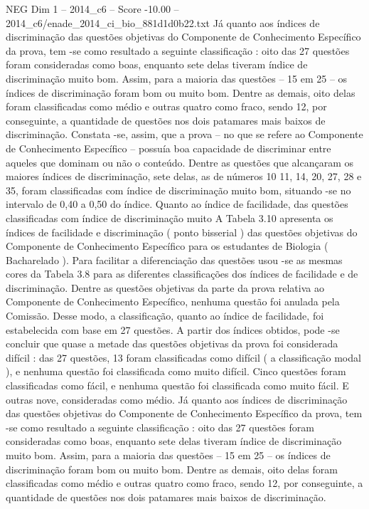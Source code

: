 \begin{textsample}{NEG Dim 1 – 2014\_c6 – Score -10.00 – 2014\_c6/enade\_2014\_ci\_bio\_881d1d0b22.txt}
Já quanto aos índices de discriminação das questões objetivas do Componente de Conhecimento Específico da prova, tem -se como resultado a seguinte classificação : oito das 27 questões foram consideradas como boas, enquanto sete delas tiveram índice de discriminação muito bom.
Assim, para a maioria das questões – 15 em 25 – os índices de discriminação foram bom ou muito bom.
Dentre as demais, oito delas foram classificadas como médio e outras quatro como fraco, sendo 12, por conseguinte, a quantidade de questões nos dois patamares mais baixos de discriminação.
Constata -se, assim, que a prova – no que se refere ao Componente de Conhecimento Específico – possuía boa capacidade de discriminar entre aqueles que dominam ou não o conteúdo.
Dentre as questões que alcançaram os maiores índices de discriminação, sete delas, as de números 10 11, 14, 20, 27, 28 e 35, foram classificadas com índice de discriminação muito bom, situando -se no intervalo de 0,40 a 0,50 do índice.
Quanto ao índice de facilidade, das questões classificadas com índice de discriminação muito A Tabela 3.10 apresenta os índices de facilidade e discriminação ( ponto bisserial ) das questões objetivas do Componente de Conhecimento Específico para os estudantes de Biologia ( Bacharelado ).
Para facilitar a diferenciação das questões usou -se as mesmas cores da Tabela 3.8 para as diferentes classificações dos índices de facilidade e de discriminação.
Dentre as questões objetivas da parte da prova relativa ao Componente de Conhecimento Específico, nenhuma questão foi anulada pela Comissão.
Desse modo, a classificação, quanto ao índice de facilidade, foi estabelecida com base em 27 questões.
A partir dos índices obtidos, pode -se concluir que quase a metade das questões objetivas da prova foi considerada difícil : das 27 questões, 13 foram classificadas como difícil ( a classificação modal ), e nenhuma questão foi classificada como muito difícil.
Cinco questões foram classificadas como fácil, e nenhuma questão foi classificada como muito fácil.
E outras nove, consideradas como médio.
Já quanto aos índices de discriminação das questões objetivas do Componente de Conhecimento Específico da prova, tem -se como resultado a seguinte classificação : oito das 27 questões foram consideradas como boas, enquanto sete delas tiveram índice de discriminação muito bom.
Assim, para a maioria das questões – 15 em 25 – os índices de discriminação foram bom ou muito bom.
Dentre as demais, oito delas foram classificadas como médio e outras quatro como fraco, sendo 12, por conseguinte, a quantidade de questões nos dois patamares mais baixos de discriminação.

\end{textsample}
